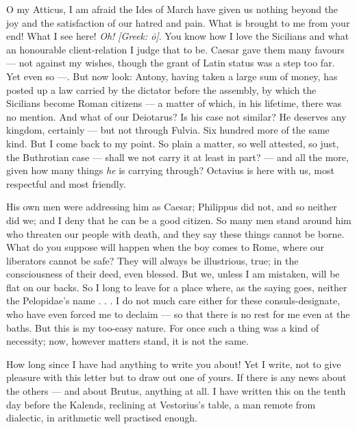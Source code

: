 

 O my Atticus, I am afraid the Ides of March have given us nothing beyond the joy and the satisfaction of our hatred and pain. What is brought to me from your end! What I see here! \textit{Oh!} \textit{[Greek: \=o]}. You know how I love the Sicilians and what an honourable client-relation I judge that to be. Caesar gave them many favours --- not against my wishes, though the grant of Latin status was a step too far. Yet even so ---. But now look: Antony, having taken a large sum of money, has posted up a law carried by the dictator before the assembly, by which the Sicilians become Roman citizens --- a matter of which, in his lifetime, there was no mention. And what of our Deiotarus? Is his case not similar? He deserves any kingdom, certainly --- but not through Fulvia. Six hundred more of the same kind. But I come back to my point. So plain a matter, so well attested, so just, the Buthrotian case --- shall we not carry it at least in part? --- and all the more, given how many things \textit{he} is carrying through? Octavius is here with us, most respectful and most friendly.

 His own men were addressing him as Caesar; Philippus did not, and so neither did we; and I deny that he can be a good citizen. So many men stand around him who threaten our people with death, and they say these things cannot be borne. What do you suppose will happen when the boy comes to Rome, where our liberators cannot be safe? They will always be illustrious, true; in the consciousness of their deed, even blessed. But we, unless I am mistaken, will be flat on our backs. So I long to leave for a place where, as the saying goes, neither the Pelopidae's name . . . I do not much care either for these consuls-designate, who have even forced me to declaim --- so that there is no rest for me even at the baths. But this is my too-easy nature. For once such a thing was a kind of necessity; now, however matters stand, it is not the same.

 How long since I have had anything to write you about! Yet I write, not to give pleasure with this letter but to draw out one of yours. If there is any news about the others --- and about Brutus, anything at all. I have written this on the tenth day before the Kalends, reclining at Vestorius's table, a man remote from dialectic, in arithmetic well practised enough.

